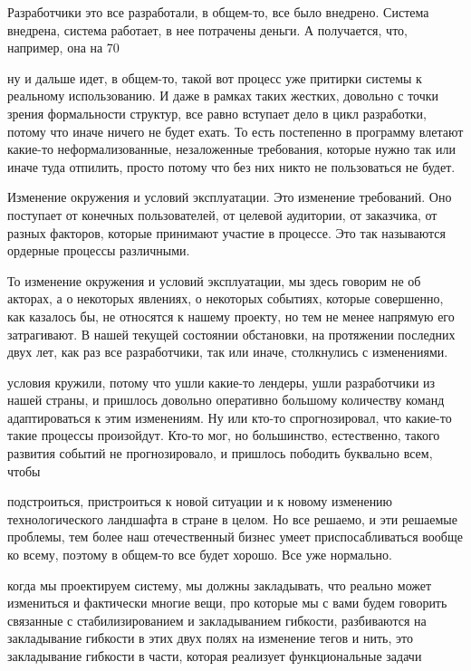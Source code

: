 Разработчики это все разработали, в общем-то, все было внедрено. Система внедрена, система работает, в нее потрачены деньги. А получается, что, например, она на 70%

ну и дальше идет, в общем-то, такой вот процесс уже притирки системы к реальному использованию. И даже в рамках таких жестких, довольно с точки зрения формальности структур, все равно вступает дело в цикл разработки, потому что иначе ничего не будет ехать. То есть постепенно в программу влетают какие-то неформализованные, незаложенные требования, которые нужно так или иначе туда отпилить, просто потому что без них никто не пользоваться не будет.

Изменение окружения и условий эксплуатации. Это изменение требований. Оно поступает от конечных пользователей, от целевой аудитории, от заказчика, от разных факторов, которые принимают участие в процессе. Это так называются ордерные процессы различными.

То изменение окружения и условий эксплуатации, мы здесь говорим не об акторах, а о некоторых явлениях, о некоторых событиях, которые совершенно, как казалось бы, не относятся к нашему проекту, но тем не менее напрямую его затрагивают. В нашей текущей состоянии обстановки, на протяжении последних двух лет, как раз все разработчики, так или иначе, столкнулись с изменениями.

условия кружили, потому что ушли какие-то лендеры, ушли разработчики из нашей страны, и пришлось довольно оперативно большому количеству команд адаптироваться к этим изменениям. Ну или кто-то спрогнозировал, что какие-то такие процессы произойдут. Кто-то мог, но большинство, естественно, такого развития событий не прогнозировало, и пришлось пободить буквально всем, чтобы

подстроиться, пристроиться к новой ситуации и к новому изменению технологического ландшафта в стране в целом. Но все решаемо, и эти решаемые проблемы, тем более наш отечественный бизнес умеет приспосабливаться вообще ко всему, поэтому в общем-то все будет хорошо. Все уже нормально.

когда мы проектируем систему, мы должны закладывать, что реально может измениться и фактически многие вещи, про которые мы с вами будем говорить связанные с стабилизированием и закладыванием гибкости, разбиваются на закладывание гибкости в этих двух полях на изменение тегов и нить, это закладывание гибкости в части, которая реализует функциональные задачи

